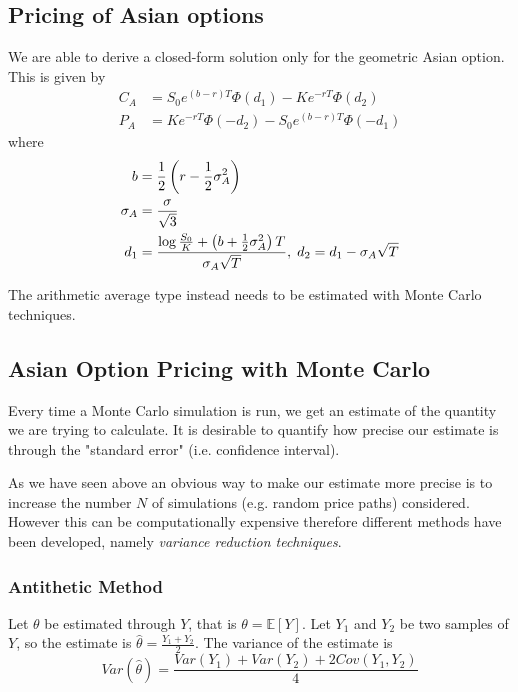 \subsection{Pricing of Asian options}
We are able to derive a closed-form solution only for the geometric Asian option.
This is given by 
\begin{equation}
\begin{aligned}
C_A&=S_{0}e^{(b-r)T}\Phi (d_{1})-Ke^{-rT}\Phi (d_{2})\\
P_A&=Ke^{-rT}\Phi (-d_{2})-S_{0}e^{(b-r)T}\Phi (-d_{1})
\end{aligned}
\end{equation}
where 
\begin{equation}
\begin{aligned}
b&={1 \over {2}}\left(r-{1 \over {2}}\sigma _A^{2}\right)\\
\sigma _A&={\sigma  \over {\sqrt {3}}} \\
d_1&={\log {S_0 \over {K}}+\left(b+{1 \over {2}}\sigma _A^2\right)T \over {\sigma_A{\sqrt {T}}}},\;d_{2}=d_1-\sigma_A{\sqrt {T}}
\end{aligned}
\end{equation}

The arithmetic average type instead needs to be estimated with Monte Carlo techniques.

\subsection{Asian Option Pricing with Monte Carlo}

Every time a Monte Carlo simulation is run, we get an estimate of the quantity we are trying to calculate. It is desirable to quantify how precise our estimate is through the "standard error" (i.e. confidence interval).

As we have seen above an obvious way to make our estimate more precise is to increase the number $N$ of simulations (e.g. random price paths) considered. However this can be computationally expensive therefore different methods have been developed, namely \emph{variance reduction techniques}.

\subsubsection{Antithetic Method}
Let $\theta$ be estimated through $Y$, that is $\theta=\mathbb{E}[Y]$. Let $Y_1$ and $Y_2$ be two samples of $Y$, so the estimate is $\hat{\theta}=\frac{Y_1+Y_2}{2}$. The variance of the estimate is 
\begin{equation*}
Var(\hat{\theta}) = \frac{Var(Y_1)+Var(Y_2)+2Cov(Y_1,Y_2)}{4}
\end{equation*}

